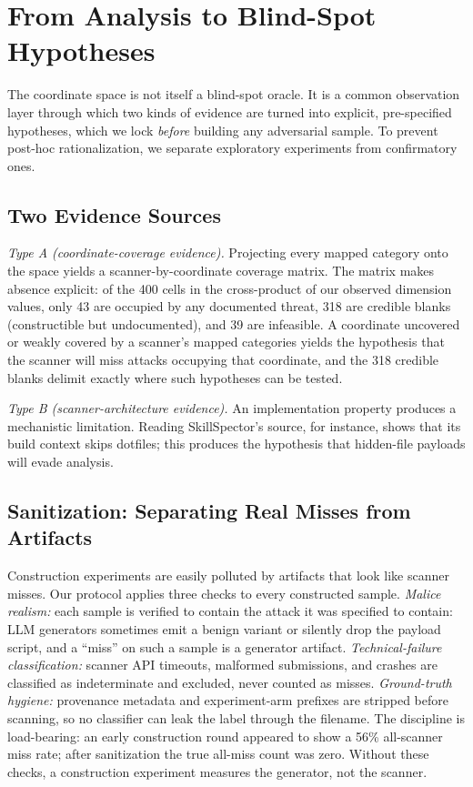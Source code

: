 \documentclass[sigconf,nonacm]{acmart}
\begin{document}
\section{From Analysis to Blind-Spot Hypotheses}
\label{sec:hypotheses}

The coordinate space is not itself a blind-spot oracle. It is a common observation layer through which two kinds of evidence are turned into explicit, pre-specified hypotheses, which we lock \emph{before} building any adversarial sample. To prevent post-hoc rationalization, we separate exploratory experiments from confirmatory ones.

\subsection{Two Evidence Sources}
\emph{Type A (coordinate-coverage evidence).} Projecting every mapped category onto the space yields a scanner-by-coordinate coverage matrix. The matrix makes absence explicit: of the 400 cells in the cross-product of our observed dimension values, only 43 are occupied by any documented threat, 318 are credible blanks (constructible but undocumented), and 39 are infeasible. A coordinate uncovered or weakly covered by a scanner's mapped categories yields the hypothesis that the scanner will miss attacks occupying that coordinate, and the 318 credible blanks delimit exactly where such hypotheses can be tested.

\emph{Type B (scanner-architecture evidence).} An implementation property produces a mechanistic limitation. Reading SkillSpector's source, for instance, shows that its build context skips dotfiles; this produces the hypothesis that hidden-file payloads will evade analysis.

\subsection{Sanitization: Separating Real Misses from Artifacts}
Construction experiments are easily polluted by artifacts that look like scanner misses. Our protocol applies three checks to every constructed sample. \emph{Malice realism:} each sample is verified to contain the attack it was specified to contain: LLM generators sometimes emit a benign variant or silently drop the payload script, and a ``miss'' on such a sample is a generator artifact. \emph{Technical-failure classification:} scanner API timeouts, malformed submissions, and crashes are classified as indeterminate and excluded, never counted as misses. \emph{Ground-truth hygiene:} provenance metadata and experiment-arm prefixes are stripped before scanning, so no classifier can leak the label through the filename. The discipline is load-bearing: an early construction round appeared to show a 56\% all-scanner miss rate; after sanitization the true all-miss count was zero. Without these checks, a construction experiment measures the generator, not the scanner.
\end{document}
